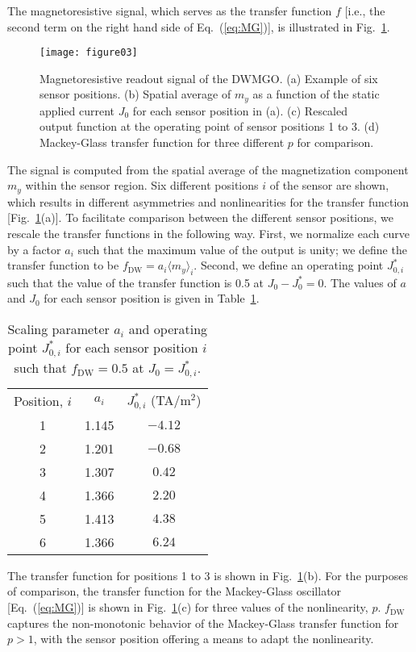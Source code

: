 \documentclass[aip,reprint,amsmath,amssymb,floatfix,superscriptaddress]{revtex4-1}
\begin{document}
The magnetoresistive signal, which serves as the transfer function $f$ [i.e., the second term on the right hand side of Eq.~(\ref{eq:MG})], is illustrated in Fig.~\ref{fig:MGfn}.
%
\begin{figure}
\centering\texttt{[image: figure03]}
\caption{Magnetoresistive readout signal of the DWMGO. (a) Example of six sensor positions. (b) Spatial average of $m_y$ as a function of the static applied current $J_0$ for each sensor position in (a). (c) Rescaled output function at the operating point of sensor positions 1 to 3. (d) Mackey-Glass transfer function for three different $p$ for comparison.}
\label{fig:MGfn}
\end{figure}
%
The signal is computed from the spatial average of the magnetization component $m_y$ within the sensor region. Six different positions $i$ of the sensor are shown, which results in different asymmetries and nonlinearities for the transfer function [Fig.~\ref{fig:MGfn}(a)]. To facilitate comparison between the different sensor positions, we rescale the transfer functions in the following way. First, we normalize each curve by a factor $a_i$ such that the maximum value of the output is unity; we define the transfer function to be $f_\mathrm{DW} = a_i \langle  m_y \rangle_i$. Second, we define an operating point $J_{0,i}^*$ such that the value of the transfer function is 0.5 at $J_0 - J_0^* = 0$. The values of $a$ and $J_0$ for each sensor position is given in Table~\ref{tab:params}.
%
\begin{table}
\caption{\label{tab:params}Scaling parameter $a_i$ and operating point $J_{0,i}^*$ for each sensor position $i$ such that $f_\mathrm{DW}=0.5$ at $J_0=J_{0,i}^*$.}
\begin{ruledtabular}
\begin{tabular}{ccc}
Position, $i$ & $a_i$ & $J_{0,i}^*$ (TA/m$^2$)\\
1 & 1.145 & $-4.12$ \\
2 & 1.201 & $-0.68$ \\
3 & 1.307 & $0.42$ \\
4 & 1.366 & $2.20$ \\
5 & 1.413 & $4.38$ \\
6 & 1.366 & $6.24$ 
\end{tabular}
\end{ruledtabular}
\end{table}
%
The transfer function for positions 1 to 3 is shown in Fig.~\ref{fig:MGfn}(b). For the purposes of comparison, the transfer function for the Mackey-Glass oscillator [Eq.~(\ref{eq:MG})] is shown in Fig.~\ref{fig:MGfn}(c) for three values of the nonlinearity, $p$. $f_\mathrm{DW}$ captures the non-monotonic behavior of the Mackey-Glass transfer function for $p>1$, with the sensor position offering a means to adapt the nonlinearity.
\end{document}
